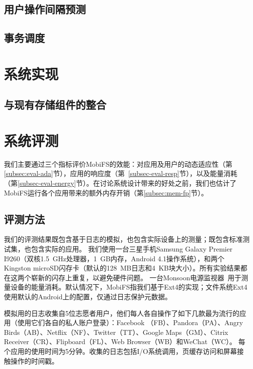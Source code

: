 \subsection{用户操作间隔预测}
\label{subsec:interval}

\subsection{事务调度}
\label{subsec:sched}

\section{系统实现}

\subsection{与现有存储组件的整合}
\label{subsec:ext4}

\section{系统评测}
\label{sec-eval}

我们主要通过三个指标评价MobiFS的效能：对应用及用户的动态适应性（第\ref{subsec:eval-ada}节），应用的响应度（第~\ref{subsec-eval-resp}节），以及能量消耗（第\ref{subsec-eval-energy}节）。在讨论系统设计带来的好处之前，我们也估计了MobiFS运行各个应用带来的额外内存开销（第\ref{subsec:mem-fp}节）。

\subsection{评测方法} \label{subsec-method}

我们的评测结果既包含基于日志的模拟，也包含实际设备上的测量；既包含标准测试集，也包含实际的应用。
我们使用一台三星手机Samsung
Galaxy Premier I9260（双核1.5~GHz处理器，1~GB内存，Android 4.1操作系统），和两个Kingston microSD闪存卡（默认的128~MB日志和4~KB块大小）。所有实验结果都在这两个崭新的闪存上重复，以避免硬件问题。
一台Monsoon电源监视器~\cite{Monsoon:PM}用于测量设备的能量消耗。默认情况下，MobiFS指我们基于Ext4的实现；文件系统Ext4使用默认的Android上的配置，仅通过日志保护元数据。

模拟用的日志收集自5位志愿者用户，他们每人各自操作了如下几款最为流行的应用（使用它们各自的私人账户登录）：Facebook
（FB）、Pandora（PA）、Angry Birds（AB）、Netflix（NF）、Twitter（TT）、Google Maps（GM）、Citrix Receiver（CR）、Flipboard（FL）、Web Browser（WB）和WeChat（WC）。 每个应用的使用时间为5分钟。收集的日志包括I/O系统调用，页缓存访问和屏幕接触操作的时间戳。

